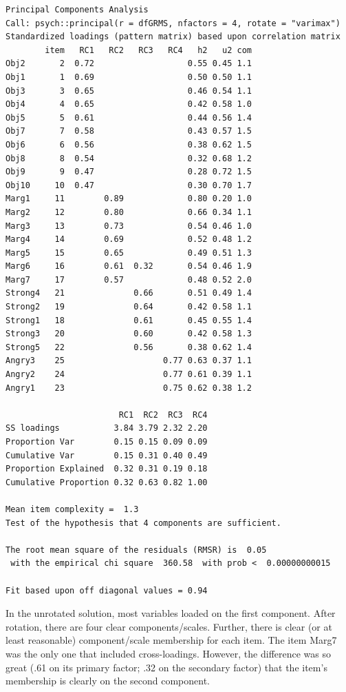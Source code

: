 \documentclass[
  english,
]{book}
\begin{document}
\begin{verbatim}
Principal Components Analysis
Call: psych::principal(r = dfGRMS, nfactors = 4, rotate = "varimax")
Standardized loadings (pattern matrix) based upon correlation matrix
        item   RC1   RC2   RC3   RC4   h2   u2 com
Obj2       2  0.72                   0.55 0.45 1.1
Obj1       1  0.69                   0.50 0.50 1.1
Obj3       3  0.65                   0.46 0.54 1.1
Obj4       4  0.65                   0.42 0.58 1.0
Obj5       5  0.61                   0.44 0.56 1.4
Obj7       7  0.58                   0.43 0.57 1.5
Obj6       6  0.56                   0.38 0.62 1.5
Obj8       8  0.54                   0.32 0.68 1.2
Obj9       9  0.47                   0.28 0.72 1.5
Obj10     10  0.47                   0.30 0.70 1.7
Marg1     11        0.89             0.80 0.20 1.0
Marg2     12        0.80             0.66 0.34 1.1
Marg3     13        0.73             0.54 0.46 1.0
Marg4     14        0.69             0.52 0.48 1.2
Marg5     15        0.65             0.49 0.51 1.3
Marg6     16        0.61  0.32       0.54 0.46 1.9
Marg7     17        0.57             0.48 0.52 2.0
Strong4   21              0.66       0.51 0.49 1.4
Strong2   19              0.64       0.42 0.58 1.1
Strong1   18              0.61       0.45 0.55 1.4
Strong3   20              0.60       0.42 0.58 1.3
Strong5   22              0.56       0.38 0.62 1.4
Angry3    25                    0.77 0.63 0.37 1.1
Angry2    24                    0.77 0.61 0.39 1.1
Angry1    23                    0.75 0.62 0.38 1.2

                       RC1  RC2  RC3  RC4
SS loadings           3.84 3.79 2.32 2.20
Proportion Var        0.15 0.15 0.09 0.09
Cumulative Var        0.15 0.31 0.40 0.49
Proportion Explained  0.32 0.31 0.19 0.18
Cumulative Proportion 0.32 0.63 0.82 1.00

Mean item complexity =  1.3
Test of the hypothesis that 4 components are sufficient.

The root mean square of the residuals (RMSR) is  0.05 
 with the empirical chi square  360.58  with prob <  0.00000000015 

Fit based upon off diagonal values = 0.94
\end{verbatim}

In the unrotated solution, most variables loaded on the first component. After rotation, there are four clear components/scales. Further, there is clear (or at least reasonable) component/scale membership for each item. The item Marg7 was the only one that included cross-loadings. However, the difference was so great (.61 on its primary factor; .32 on the secondary factor) that the item's membership is clearly on the second component.
\end{document}
